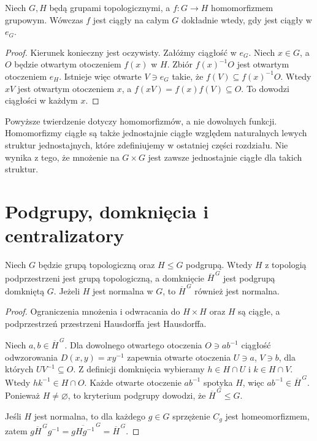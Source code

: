 \begin{stwierdzenie}
\label{prop:topog24-hom-continuity}
Niech \(G,H\) będą grupami topologicznymi,
a \(f\colon G\to H\) homomorfizmem grupowym.
Wówczas \(f\) jest ciągły na całym \(G\)
dokładnie wtedy, gdy jest ciągły w \(e_G\).
\end{stwierdzenie}
\begin{proof}
Kierunek konieczny jest oczywisty.
Załóżmy ciągłość w \(e_G\).
Niech \(x\in G\), a \(O\)
będzie otwartym otoczeniem \(f(x)\) w \(H\).
Zbiór \(f(x)^{-1}O\) jest
otwartym otoczeniem \(e_H\).
Istnieje więc otwarte \(V\ni e_G\)
takie, że \(f(V)\subseteq f(x)^{-1}O\).
Wtedy \(xV\) jest otwartym otoczeniem \(x\),
a \(f(xV)=f(x)f(V)\subseteq O\).
To dowodzi ciągłości w każdym \(x\).
\end{proof}

\begin{uwaga}
\label{rem:topog24-hom-uniform}
Powyższe twierdzenie dotyczy
homomorfizmów, a nie dowolnych funkcji.
Homomorfizmy ciągłe są także
jednostajnie ciągłe względem
naturalnych lewych struktur jednostajnych,
które zdefiniujemy w ostatniej części rozdziału.
Nie wynika z tego, że mnożenie na
\(G\times G\) jest zawsze jednostajnie
ciągłe dla takich struktur.
\end{uwaga}

\section{Podgrupy, domknięcia i centralizatory}
\label{sec:topog24-subgroups}

\begin{twierdzenie}
\label{thm:topog24-subgroup-closure}
Niech \(G\) będzie grupą topologiczną
oraz \(H\le G\) podgrupą.
Wtedy \(H\) z topologią podprzestrzeni
jest grupą topologiczną,
a domknięcie \(\overline H^{\,G}\)
jest podgrupą domkniętą \(G\).
Jeżeli \(H\) jest normalna w \(G\),
to \(\overline H^{\,G}\) również jest normalna.
\end{twierdzenie}
\begin{proof}
Ograniczenia mnożenia i odwracania
do \(H\times H\) oraz \(H\)
są ciągłe, a podprzestrzeń
przestrzeni Hausdorffa jest Hausdorffa.

Niech \(a,b\in\overline H^{\,G}\).
Dla dowolnego otwartego otoczenia
\(O\ni ab^{-1}\)
ciągłość odwzorowania
\(D(x,y)=xy^{-1}\)
zapewnia otwarte otoczenia
\(U\ni a\), \(V\ni b\),
dla których \(UV^{-1}\subseteq O\).
Z definicji domknięcia
wybieramy \(h\in H\cap U\)
i \(k\in H\cap V\).
Wtedy \(hk^{-1}\in H\cap O\).
Każde otwarte otoczenie \(ab^{-1}\)
spotyka \(H\), więc
\(ab^{-1}\in\overline H^{\,G}\).
Ponieważ \(H\neq\varnothing\),
to kryterium podgrupy
dowodzi, że \(\overline H^{\,G}\le G\).

Jeśli \(H\) jest normalna,
to dla każdego \(g\in G\)
sprzężenie \(C_g\) jest homeomorfizmem,
zatem
\(g\overline H^{\,G}g^{-1}
=\overline{gHg^{-1}}^{\,G}
=\overline H^{\,G}\).
\end{proof}

